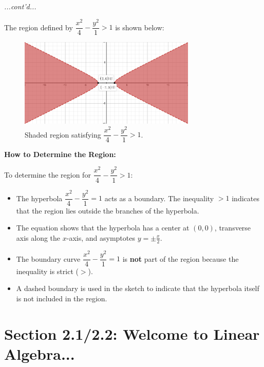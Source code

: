 \documentclass{article}
\begin{document}
\begin{examplebox}
\textit{...cont'd...}
\begin{solutionbox}
    The region defined by \( \dfrac{x^2}{4} - \dfrac{y^2}{1} > 1 \) is shown below:
    
    \begin{blankbox}
    \begin{figure}[H]
        \centering
        \includegraphics[width=0.75\textwidth]{x^2 over 4 + y^2 gt 1.png}
        \caption{Shaded region satisfying \( \dfrac{x^2}{4} - \dfrac{y^2}{1} > 1 \).}
        \label{fig:hyperbola_region}
    \end{figure}
    \end{blankbox}

    \textbf{How to Determine the Region:}
    \begin{conceptbox}
    To determine the region for \( \dfrac{x^2}{4} - \dfrac{y^2}{1} > 1 \):
    \begin{itemize}
        \item The hyperbola \( \dfrac{x^2}{4} - \dfrac{y^2}{1} = 1 \) acts as a boundary. The inequality \( > 1 \) indicates that the region lies outside the branches of the hyperbola.
        \item The equation shows that the hyperbola has a center at \( (0,0) \), transverse axis along the \( x \)-axis, and asymptotes \( y = \pm \frac{x}{2} \).
        \item The boundary curve \( \dfrac{x^2}{4} - \dfrac{y^2}{1} = 1 \) is \textbf{not} part of the region because the inequality is strict (\( > \)).
        \item A dashed boundary is used in the sketch to indicate that the hyperbola itself is not included in the region.
    \end{itemize}
    \end{conceptbox}
\end{solutionbox}    
\end{examplebox}

\section*{Section 2.1/2.2: Welcome to Linear Algebra...}
\end{document}
